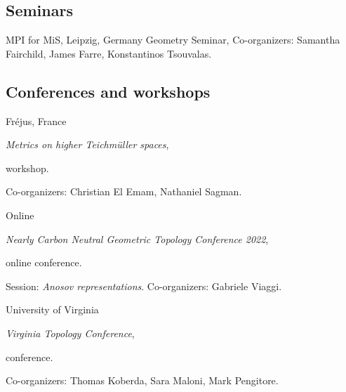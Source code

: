 
\subsection{Seminars}

{MPI for MiS, Leipzig, Germany}
{Geometry Seminar,}
{Co-organizers: Samantha Fairchild, James Farre, Konstantinos Tsouvalas.}

\subsection{Conferences and workshops}

{Fr\'ejus, France}
{\emph{Metrics on higher Teichm\"uller spaces}, \begin{footnotesize}
		workshop.
\end{footnotesize}}
{Co-organizers: Christian El Emam, Nathaniel Sagman.}

{Online}
{\emph{Nearly Carbon Neutral Geometric Topology Conference 2022}, \begin{footnotesize}
		online conference.
\end{footnotesize}}
{Session: \emph{Anosov representations}. Co-organizers: Gabriele Viaggi.}

{University of Virginia}
{\emph{Virginia Topology Conference}, \begin{footnotesize}
		conference.
\end{footnotesize}}
{Co-organizers: Thomas Koberda, Sara Maloni, Mark Pengitore.}
%